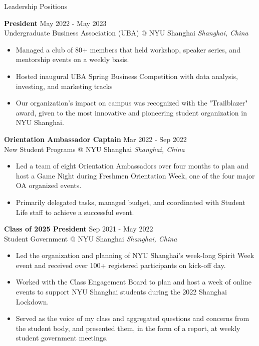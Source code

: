 \documentclass{cv} %
\begin{document}
\begin{rSection}{Leadership Positions}

	\textbf{President} \hfill May 2022 - May 2023 \\
	Undergraduate Business Association (UBA) @ NYU Shanghai \hfill \textit{Shanghai, China}
	\begin{itemize}
		\item Managed a club of 80+ members that held workshop, speaker series, and mentorship events on a weekly basis.
		\item Hosted inaugural UBA Spring Business Competition with data analysis, investing, and marketing tracks
		\item Our organization's impact on campus was recognized with the "Trailblazer" award, given to the most innovative and pioneering student organization in NYU Shanghai.
	\end{itemize}

	\textbf{Orientation Ambassador Captain} \hfill Mar 2022 - Sep 2022 \\
	New Student Programs @ NYU Shanghai \hfill \textit{Shanghai, China}
	\begin{itemize}
		\item Led a team of eight Orientation Ambassadors over four months to plan and host a Game Night during Freshmen Orientation Week, one of the four major OA organized events.
		\item Primarily delegated tasks, managed budget, and coordinated with Student Life staff to achieve a successful event.
	\end{itemize}

	\textbf{Class of 2025 President} \hfill Sep 2021 - May 2022 \\
	Student Government @ NYU Shanghai \hfill \textit{Shanghai, China}
	\begin{itemize}
		\item Led the organization and planning of NYU Shanghai’s week-long Spirit Week event and received over 100+ registered participants on kick-off day.
		\item Worked with the Class Engagement Board to plan and host a week of online events to support NYU Shanghai students during the 2022 Shanghai Lockdown.
		\item Served as the voice of my class and aggregated questions and concerns from the student body, and presented them, in the form of a report, at weekly student government meetings.
	\end{itemize}

\end{rSection}
\end{document}
